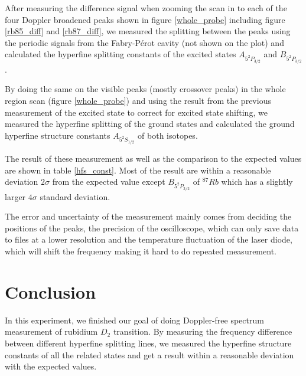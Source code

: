 \documentclass[aps,twocolumn,secnumarabic,balancelastpage,amsmath,amssymb,nofootinbib]{revtex4}
\begin{document}
After measuring the difference signal when zooming the scan in to each of the four Doppler broadened peaks shown in figure \ref{whole_probe} including figure \ref{rb85_diff} and \ref{rb87_diff}, we measured the splitting between the peaks using the periodic signals from the Fabry-P\'erot cavity (not shown on the plot) and calculated the hyperfine splitting constants of the excited states $A_{5^2P_{3/2}}$ and $B_{5^2P_{3/2}}$.

By doing the same on the visible peaks (mostly crossover peaks) in the whole region scan (figure \ref{whole_probe}) and using the result from the previous measurement of the excited state to correct for excited state shifting, we measured the hyperfine splitting of the ground states and calculated the ground hyperfine structure constants $A_{5^2S_{1/2}}$ of both isotopes.

The result of these measurement as well as the comparison to the expected values are shown in table \ref{hfs_const}. Most of the result are within a reasonable deviation $2\sigma$ from the expected value except $B_{5^2P_{3/2}}$ of ${}^{87}Rb$ which has a slightly larger $4\sigma$ standard deviation.

The error and uncertainty of the measurement mainly comes from deciding the positions of the peaks, the precision of the oscilloscope, which can only save data to files at a lower resolution and the temperature fluctuation of the laser diode, which will shift the frequency making it hard to do repeated measurement.

\section{Conclusion}
In this experiment, we finished our goal of doing Doppler-free spectrum measurement of rubidium $D_2$ transition. By measuring the frequency difference between different hyperfine splitting lines, we measured the hyperfine structure constants of all the related states and get a result within a reasonable deviation with the expected values.


\end{document}
